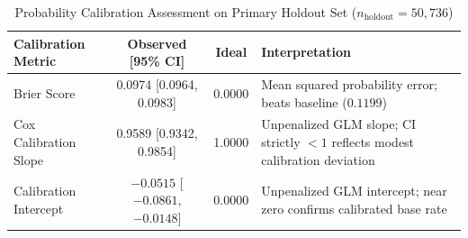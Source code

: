 \begin{table}[htbp]
\centering
\caption{Probability Calibration Assessment on Primary Holdout Set ($n_{\text{holdout}} = 50,736$)}
\label{tab:calibration}
\footnotesize
\setlength{\tabcolsep}{3pt}
\begin{tabular}{@{}lccp{5.2cm}@{}}
\toprule
\textbf{Calibration Metric} & \textbf{Observed [95\% CI]} & \textbf{Ideal} & \textbf{Interpretation} \\
\midrule
Brier Score & 0.0974 [0.0964, 0.0983] & 0.0000 & Mean squared probability error; beats baseline ($0.1199$) \\
Cox Calibration Slope & 0.9589 [0.9342, 0.9854] & 1.0000 & Unpenalized GLM slope; CI strictly $< 1$ reflects modest calibration deviation \\
Calibration Intercept & $-0.0515$ [$-0.0861$, $-0.0148$] & 0.0000 & Unpenalized GLM intercept; near zero confirms calibrated base rate \\
\bottomrule
\end{tabular}
\end{table}
